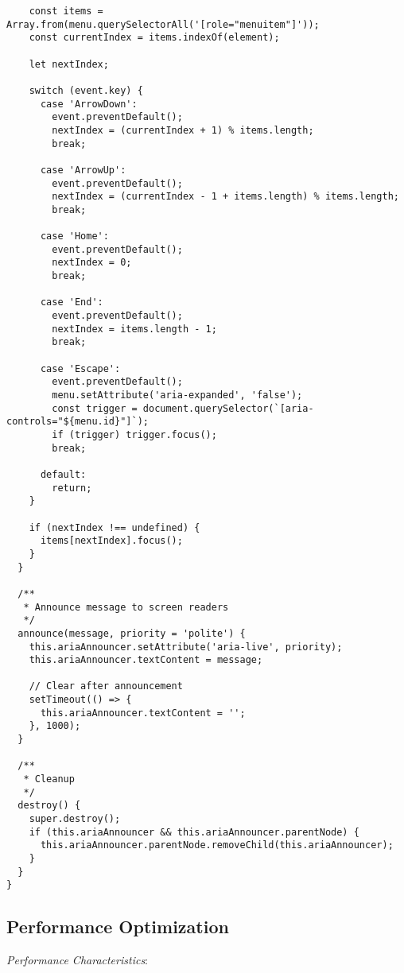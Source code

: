 \documentclass[11pt]{article}
\begin{document}
\begin{verbatim}
    const items = Array.from(menu.querySelectorAll('[role="menuitem"]'));
    const currentIndex = items.indexOf(element);
    
    let nextIndex;
    
    switch (event.key) {
      case 'ArrowDown':
        event.preventDefault();
        nextIndex = (currentIndex + 1) % items.length;
        break;
      
      case 'ArrowUp':
        event.preventDefault();
        nextIndex = (currentIndex - 1 + items.length) % items.length;
        break;
      
      case 'Home':
        event.preventDefault();
        nextIndex = 0;
        break;
      
      case 'End':
        event.preventDefault();
        nextIndex = items.length - 1;
        break;
      
      case 'Escape':
        event.preventDefault();
        menu.setAttribute('aria-expanded', 'false');
        const trigger = document.querySelector(`[aria-controls="${menu.id}"]`);
        if (trigger) trigger.focus();
        break;
      
      default:
        return;
    }
    
    if (nextIndex !== undefined) {
      items[nextIndex].focus();
    }
  }
  
  /**
   * Announce message to screen readers
   */
  announce(message, priority = 'polite') {
    this.ariaAnnouncer.setAttribute('aria-live', priority);
    this.ariaAnnouncer.textContent = message;
    
    // Clear after announcement
    setTimeout(() => {
      this.ariaAnnouncer.textContent = '';
    }, 1000);
  }
  
  /**
   * Cleanup
   */
  destroy() {
    super.destroy();
    if (this.ariaAnnouncer && this.ariaAnnouncer.parentNode) {
      this.ariaAnnouncer.parentNode.removeChild(this.ariaAnnouncer);
    }
  }
}
\end{verbatim}
\subsection{Performance Optimization}
\label{sec:orgbc92f7d}

\emph{Performance Characteristics}:
\end{document}
